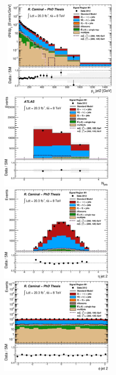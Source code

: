 \begin{figure}[!ht]
  \begin{center}
    \mbox{
      \includegraphics[width=0.495\textwidth]{MonojetAnalysis/Figures/plot_Stop_A6_SR_pt2_fitted.eps}
      \includegraphics[width=0.495\textwidth]{MonojetAnalysis/Figures/plot_Stop_A6_SR_n_jets_fitted.eps}
    }
    \mbox{
      \includegraphics[width=0.495\textwidth]{MonojetAnalysis/Figures/plot_Stop_A6_SR_eta2_fitted.eps}
      \includegraphics[width=0.495\textwidth]{MonojetAnalysis/Figures/plot_Stop_A6_SR_phi2_fitted.eps}
}
\end{center}
\end{figure}
